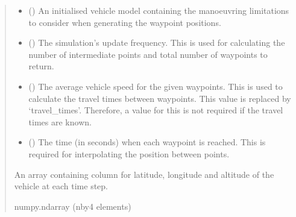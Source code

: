 \documentclass[letterpaper,10pt,english]{sphinxmanual}
\begin{document}
\begin{fulllineitems}
\begin{quote}
\begin{description}
\begin{itemize}
\item {} 
\sphinxAtStartPar
{} ({\hyperref[\detokenize{modules/waypoints/vehicle:qnav.waypoints.vehicle.Vehicle}]{}}) \textendash{} An initialised vehicle model containing the
manoeuvring limitations to consider when generating the waypoint
positions.

\item {} 
\sphinxAtStartPar
{} () \textendash{} The simulation’s update frequency. This is used for
calculating the number of intermediate points and total number of
waypoints to return.

\item {} 
\sphinxAtStartPar
{} () \textendash{} The average vehicle speed for the given waypoints. This
is used to calculate the travel times between waypoints. This value is
replaced by ‘travel\_times’. Therefore, a value for this is not
required if the travel times are known.

\item {} 
\sphinxAtStartPar
{} () \textendash{} The time (in seconds) when each waypoint is reached.
This is required for interpolating the position between points.

\end{itemize}

\sphinxAtStartPar
An array containing column for latitude, longitude and altitude
of the vehicle at each time step.

\sphinxAtStartPar
numpy.ndarray (n\sphinxhyphen{}by\sphinxhyphen{}4 elements)

\end{description}\end{quote}

\end{fulllineitems}

\end{document}

